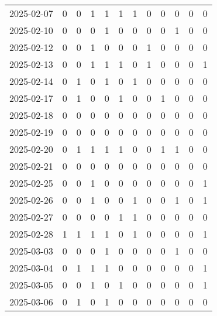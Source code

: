 \documentclass[dvipdfmx,oneside]{article}
\begin{document}
\begin{tabular}{lccccccccccc}
        2025-02-07 &     0 &     0 &     1 &     1 &     1 &     1 &     0 &     0 &     0 &     0 &     0 \\
        2025-02-10 &     0 &     0 &     0 &     1 &     0 &     0 &     0 &     0 &     1 &     0 &     0 \\
        2025-02-12 &     0 &     0 &     1 &     0 &     0 &     0 &     1 &     0 &     0 &     0 &     0 \\
        2025-02-13 &     0 &     0 &     1 &     1 &     1 &     0 &     1 &     0 &     0 &     0 &     1 \\
        2025-02-14 &     0 &     1 &     0 &     1 &     0 &     1 &     0 &     0 &     0 &     0 &     0 \\
        2025-02-17 &     0 &     1 &     0 &     0 &     1 &     0 &     0 &     1 &     0 &     0 &     0 \\
        2025-02-18 &     0 &     0 &     0 &     0 &     0 &     0 &     0 &     0 &     0 &     0 &     0 \\
        2025-02-19 &     0 &     0 &     0 &     0 &     0 &     0 &     0 &     0 &     0 &     0 &     0 \\
        2025-02-20 &     0 &     1 &     1 &     1 &     1 &     0 &     0 &     1 &     1 &     0 &     0 \\
        2025-02-21 &     0 &     0 &     0 &     0 &     0 &     0 &     0 &     0 &     0 &     0 &     0 \\
        2025-02-25 &     0 &     0 &     1 &     0 &     0 &     0 &     0 &     0 &     0 &     0 &     1 \\
        2025-02-26 &     0 &     0 &     1 &     0 &     0 &     1 &     0 &     0 &     1 &     0 &     1 \\
        2025-02-27 &     0 &     0 &     0 &     0 &     1 &     1 &     0 &     0 &     0 &     0 &     0 \\
        2025-02-28 &     1 &     1 &     1 &     1 &     0 &     1 &     0 &     0 &     0 &     0 &     1 \\
        2025-03-03 &     0 &     0 &     0 &     1 &     0 &     0 &     0 &     0 &     1 &     0 &     0 \\
        2025-03-04 &     0 &     1 &     1 &     1 &     0 &     0 &     0 &     0 &     0 &     0 &     1 \\
        2025-03-05 &     0 &     0 &     1 &     0 &     1 &     0 &     0 &     0 &     0 &     0 &     1 \\
        2025-03-06 &     0 &     1 &     0 &     1 &     0 &     0 &     0 &     0 &     0 &     0 &     0 \\

\end{tabular}
\end{document}
